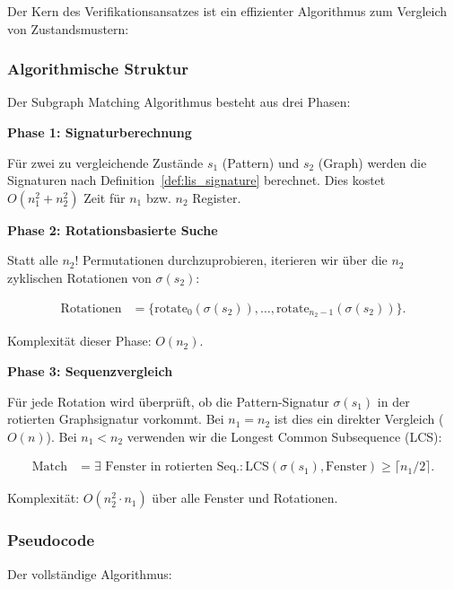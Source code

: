 \documentclass[a4paper,12pt]{article}
\theoremstyle{definition}
\begin{document}
Der Kern des Verifikationsansatzes ist ein effizienter Algorithmus zum Vergleich von Zustandsmustern:

\subsubsection{Algorithmische Struktur}

Der Subgraph Matching Algorithmus besteht aus drei Phasen:

\textbf{Phase 1: Signaturberechnung}

Für zwei zu vergleichende Zustände $s_1$ (Pattern) und $s_2$ (Graph) werden die Signaturen nach Definition~\ref{def:lis_signature} berechnet. Dies kostet $O(n_1^2 + n_2^2)$ Zeit für $n_1$ bzw. $n_2$ Register.

\textbf{Phase 2: Rotationsbasierte Suche}

Statt alle $n_2!$ Permutationen durchzuprobieren, iterieren wir über die $n_2$ zyklischen Rotationen von $\sigma(s_2)$:

\begin{align}
\text{Rotationen} &= \{\text{rotate}_0(\sigma(s_2)), \ldots, \text{rotate}_{n_2-1}(\sigma(s_2))\}.
\end{align}

Komplexität dieser Phase: $O(n_2)$.

\textbf{Phase 3: Sequenzvergleich}

Für jede Rotation wird überprüft, ob die Pattern-Signatur $\sigma(s_1)$ in der rotierten Graphsignatur vorkommt. Bei $n_1 = n_2$ ist dies ein direkter Vergleich ($O(n)$). Bei $n_1 < n_2$ verwenden wir die Longest Common Subsequence (LCS):

\begin{align}
\text{Match} &= \exists \text{ Fenster in rotierten Seq.}: \text{LCS}(\sigma(s_1), \text{Fenster}) \geq \lceil n_1 / 2 \rceil.
\end{align}

Komplexität: $O(n_2^2 \cdot n_1)$ über alle Fenster und Rotationen.

\subsubsection{Pseudocode}

Der vollständige Algorithmus:
\end{document}
